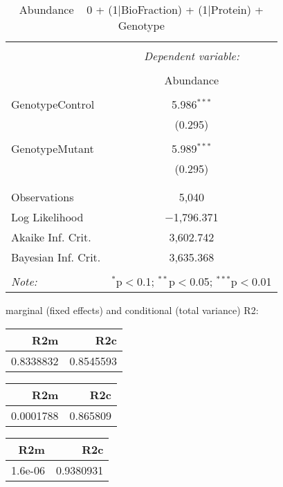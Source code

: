 \documentclass[11pt]{report}
\begin{document}
\begin{table}[!htbp] \centering 
  \caption{Abundance ~ 0 + (1|BioFraction) + (1|Protein) + Genotype} 
  \label{} 
\begin{tabular}{@{\extracolsep{5pt}}lc} 
\\[-1.8ex]\hline 
\hline \\[-1.8ex] 
 & \multicolumn{1}{c}{\textit{Dependent variable:}} \\ 
\cline{2-2} 
\\[-1.8ex] & Abundance \\ 
\hline \\[-1.8ex] 
 GenotypeControl & 5.986$^{***}$ \\ 
  & (0.295) \\ 
  & \\ 
 GenotypeMutant & 5.989$^{***}$ \\ 
  & (0.295) \\ 
  & \\ 
\hline \\[-1.8ex] 
Observations & 5,040 \\ 
Log Likelihood & $-$1,796.371 \\ 
Akaike Inf. Crit. & 3,602.742 \\ 
Bayesian Inf. Crit. & 3,635.368 \\ 
\hline 
\hline \\[-1.8ex] 
\textit{Note:}  & \multicolumn{1}{r}{$^{*}$p$<$0.1; $^{**}$p$<$0.05; $^{***}$p$<$0.01} \\ 
\end{tabular} 
\end{table} 
marginal (fixed effects) and conditional (total variance) R2:

\begin{tabular}{r|r}
\hline
R2m & R2c\\
\hline
0.8338832 & 0.8545593\\
\hline
\end{tabular}

\begin{tabular}{r|r}
\hline
R2m & R2c\\
\hline
0.0001788 & 0.865809\\
\hline
\end{tabular}

\begin{tabular}{r|r}
\hline
R2m & R2c\\
\hline
1.6e-06 & 0.9380931\\
\hline
\end{tabular}
\end{document}
